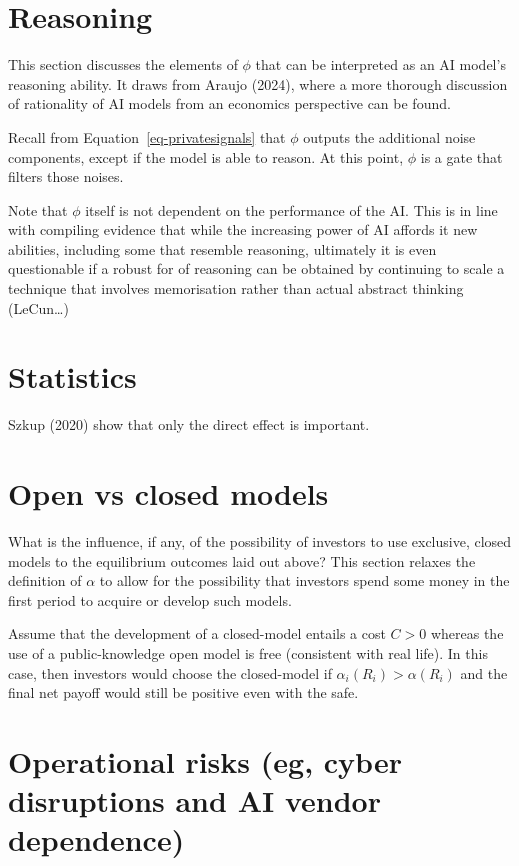 \documentclass[
]{article}
\theoremstyle{plain}
\theoremstyle{remark}
\begin{document}
\section{Reasoning}\label{sec-reasoning}

This section discusses the elements of \(\phi\) that can be interpreted
as an AI model's reasoning ability. It draws from Araujo (2024), where a
more thorough discussion of rationality of AI models from an economics
perspective can be found.

Recall from Equation~\ref{eq-privatesignals} that \(\phi\) outputs the
additional noise components, except if the model is able to reason. At
this point, \(\phi\) is a gate that filters those noises.

Note that \(\phi\) itself is not dependent on the performance of the AI.
This is in line with compiling evidence that while the increasing power
of AI affords it new abilities, including some that resemble reasoning,
ultimately it is even questionable if a robust for of reasoning can be
obtained by continuing to scale a technique that involves memorisation
rather than actual abstract thinking (LeCun\ldots)

\section{Statistics}\label{statistics}

Szkup (2020) show that only the direct effect is important.

\section{Open vs closed models}\label{sec-closedmodels}

What is the influence, if any, of the possibility of investors to use
exclusive, closed models to the equilibrium outcomes laid out above?
This section relaxes the definition of \(\alpha\) to allow for the
possibility that investors spend some money in the first period to
acquire or develop such models.

Assume that the development of a closed-model entails a cost \(C > 0\)
whereas the use of a public-knowledge open model is free (consistent
with real life). In this case, then investors would choose the
closed-model if \(\alpha_i(R_i) > \alpha(R_i)\) and the final net payoff
would still be positive even with the safe.

\section{Operational risks (eg, cyber disruptions and AI vendor
dependence)}\label{operational-risks-eg-cyber-disruptions-and-ai-vendor-dependence}
\end{document}
